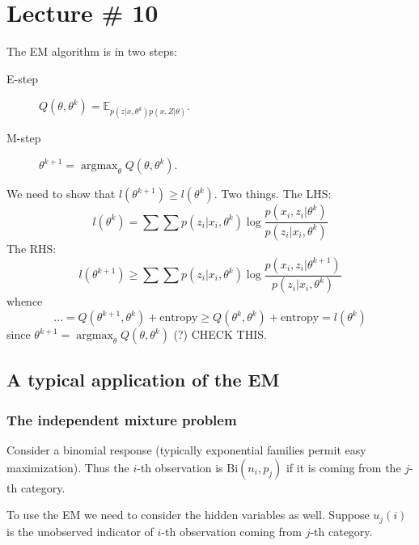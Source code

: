 \documentclass[a4paper]{article}
\newcommand{\brac}[1]{{\left ( #1 \right )}}
\newcommand{\ex}{\mathbb{E}}
\newcommand{\argmax}{\mathop{\text{argmax}}}
\begin{document}




\clearpage
\section{Lecture \# 10} %
\label{sec:lecture_10}

The EM algorithm is in two steps: \begin{description}
	\item[E-step] $Q\brac{\theta, \theta^k} = \ex_{p(z\lvert x, \theta^k) p(x,Z\lvert \theta)}$.
	\item[M-step] $\theta^{k+1}=\argmax_\theta Q(\theta, \theta^k)$.
\end{description}

We need to show that $l(\theta^{k+1})\geq l(\theta^k)$. Two things. The LHS:
\[l(\theta^k) = \sum \sum p(z_i\lvert x_i,\theta^k) \log\frac{p(x_i,z_i\lvert\theta^k)}{p(z_i\lvert x_i,\theta^k)}\]
The RHS:
\[l(\theta^{k+1}) \geq \sum \sum p(z_i\lvert x_i,\theta^k) \log\frac{p(x_i,z_i\lvert\theta^{k+1})}{p(z_i\lvert x_i,\theta^k)}\]
whence 
\[\ldots = Q(\theta^{k+1}, \theta^k) + \text{entropy}\geq Q(\theta^k, \theta^k) + \text{entropy} = l(\theta^k)\]
since $\theta^{k+1} = \argmax_\theta Q(\theta, \theta^k)$ (?) CHECK THIS.

\subsection{A typical application of the EM} %
\label{sub:a_typical_application_of_the_em}

\subsubsection{The independent mixture problem} %
\label{ssub:the_independent_mixture_problem}
Consider a binomial response (typically exponential families permit easy maximization). 
Thus the $i$-th observation is $\text{Bi}(n_i, p_j)$ if it is coming from the $j$-th category.

To use the EM we need to consider the hidden variables as well. Suppose $u_j(i)$ is the unobserved
indicator of $i$-th observation coming from $j$-th category.
\end{document}
